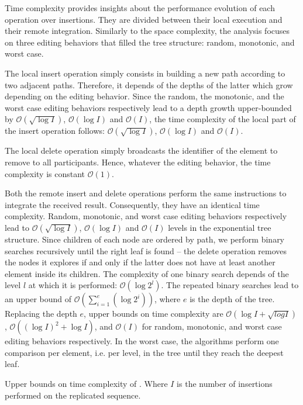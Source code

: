 Time complexity provides insights about the performance evolution of each
operation over insertions. They are divided between their local execution and
their remote integration.  Similarly to the space complexity, the analysis
focuses on three editing behaviors that filled the tree structure: random,
monotonic, and worst case.

The local insert operation simply consists in building a new path according to
two adjacent paths. Therefore, it depends of the depths of the latter which grow
depending on the editing behavior. Since the random, the monotonic, and the
worst case editing behaviors respectively lead to a depth growth upper-bounded
by $\mathcal{O}(\sqrt{\log I})$, $\mathcal{O}(\log I)$ and $\mathcal{O}(I)$, the
time complexity of the local part of the insert operation follows:
$\mathcal{O}(\sqrt{\log I})$, $\mathcal{O}(\log I)$ and $\mathcal{O}(I)$.

The local delete operation simply broadcasts the identifier of the element to
remove to all participants. Hence, whatever the editing behavior, the time
complexity is constant $\mathcal{O}(1)$.

Both the remote insert and delete operations perform the same instructions to
integrate the received result. Consequently, they have an identical time
complexity. Random, monotonic, and worst case editing behaviors respectively
lead to $\mathcal{O}(\sqrt{\log I})$, $\mathcal{O}(\log I)$ and $\mathcal{O}(I)$
levels in the exponential tree structure. Since children of each node are
ordered by path, we perform binary searches recursively until the right leaf is
found -- the delete operation removes the nodes it explores if and only if the
latter does not have at least another element inside its children. The
complexity of one binary search depends of the level $l$ at which it is
performed: $\mathcal{O}(\log 2^l)$. The repeated binary searches lead to an
upper bound of $\mathcal{O}(\textstyle\sum\nolimits_{i=1}^{e}(\log 2^i))$, where
$e$ is the depth of the tree. Replacing the depth $e$, upper bounds on time
complexity are $\mathcal{O}(\log I + \sqrt{log I})$,
$\mathcal{O}((\log I)^2+\log I)$, and $\mathcal{O}(I)$ for random, monotonic,
and worst case editing behaviors respectively. In the worst case, the algorithms
perform one comparison per element, i.e. per level, in the tree until they reach
the deepest leaf.


\begin{table}
  \caption{\label{table:lseqtime}
    Upper bounds on time complexity of \LSEQ. Where $I$ is the number of 
    insertions performed on the replicated sequence.}
  \centering
  
\end{table}

